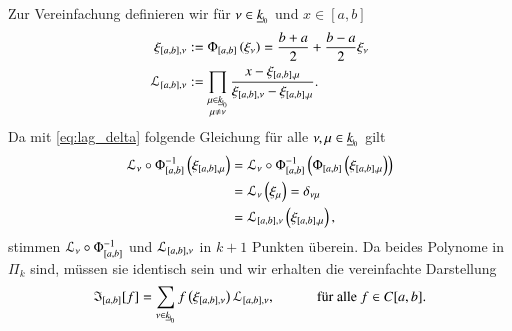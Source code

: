       Zur Vereinfachung definieren wir für $\nu \in \nullhaken{k}$ und $x \in [a,b]$
      \begin{align*}
	\xi_{[a,b],  \nu} &:= \Phi_{[a,b]}\left(\xi_\nu\right) = \frac{b + a}{2} + \frac{b - a}{2} \xi_\nu\\
	\lag_{[a,b], \nu} &:= \prod_{\substack{\mu \in \nullhaken{k} \\ \mu \neq \nu}} \frac{x - \xi_{[a,b],  \mu}}{\xi_{[a,b],  \nu} - \xi_{[a,b],  \mu}}.
      \end{align*}
      Da mit \autoref{eq:lag_delta} folgende Gleichung für alle $\nu,\mu \in \nullhaken{k}$ gilt
      \begin{align*}
	 \mathcal{L}_\nu \circ \Phi_{[a,b]}^{-1}\left(\xi_{[a,b],\mu}\right) &= \mathcal{L}_\nu \circ \Phi_{[a,b]}^{-1} \left( \Phi_{[a,b]}\left(\xi_{[a,b],\mu}\right) \right)\\
							    &= \mathcal{L}_\nu \left(\xi_\mu\right) = \delta_{\nu\mu}\\
							    &= \mathcal{L}_{[a,b],\nu}\left( \xi_{[a,b],\mu} \right),
      \end{align*}
      stimmen $\mathcal{L}_\nu \circ \Phi_{[a,b]}^{-1}$ und $\mathcal{L}_{[a,b],\nu}$ in $k+1$ Punkten überein. Da beides Polynome in $\Pi_k$ sind, müssen sie identisch sein und wir erhalten die vereinfachte
      Darstellung
      \begin{equation*}
	\mathfrak{I}_{[a,b]}[f] = \sum_{\nu \in \nullhaken{k}} f\left(\xi_{[a,b],\nu}\right) \lag_{[a,b],\nu}, \ \ \ \ \ \ \ \ \ \ \ \ \text{für alle } f \in C[a,b].
      \end{equation*}
      
